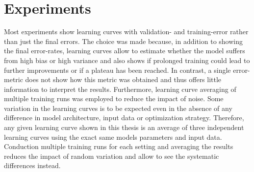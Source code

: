  
\section{Experiments}

Most experiments show learning curves with validation- and training-error rather than just the final errors. The choice was made because, in addition to showing the final error-rates, learning curves allow to estimate whether the model suffers from high bias or high variance and also shows if prolonged training could lead to further improvements or if a plateau has been reached. In contrast, a single error-metric does not show how this metric was obtained and thus offers little information to interpret the results. Furthermore, learning curve averaging of multiple training runs was employed to reduce the impact of noise. Some variation in the learning curves is to be expected even in the absence of any difference in model architecture, input data or optimization strategy. Therefore, any given learning curve shown in this thesis is an average of three independent learning curves using the exact same models parameters and input data. Conduction multiple training runs for each setting and averaging the results reduces the impact of random variation and allow to see the systematic differences instead. 


